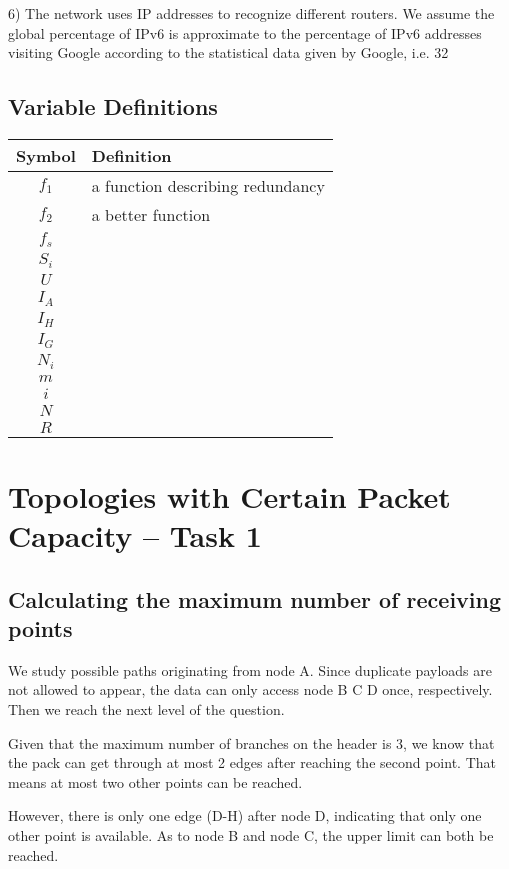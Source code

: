 \documentclass{mcmthesis}
\begin{document}
6) The network uses IP addresses to recognize different routers. We assume the global percentage of IPv6 is approximate to the percentage of IPv6 addresses visiting Google according to the statistical data given by Google, i.e. 32%



\subsection{Variable Definitions}
\begin{center}
	\begin{tabular}{cl}
		\hline
		Symbol & Definition \\
		\hline
		$f_{1}$ & a function describing redundancy\\
		$f_{2}$ & a better function \\ 
		$f_{s}$ & \\ 
		$S_{i}$ & \\ 
		$U$ & \\
		$I_{A}$ & \\
		$I_{H}$ & \\
		$I_{G}$ & \\
		$N_{i}$ & \\
		$m$ & \\
		$i$ & \\
		$N$ & \\
		$R$ & \\
		\hline
	\end{tabular}
\end{center}

\section{Topologies with Certain Packet Capacity -- Task 1}
\subsection{Calculating the maximum number of receiving points}

We study possible paths originating from node A. Since duplicate payloads are not allowed to appear, the data can only access node B C D once, respectively. Then we reach the next level of the question. 

Given that the maximum number of branches on the header is 3, we know that the pack can get through at most 2 edges after reaching the second point. That means at most two other points can be reached. 

However, there is only one edge (D-H) after node D, indicating that only one other point is available. As to node B and node C, the upper limit can both be reached.
\end{document}
